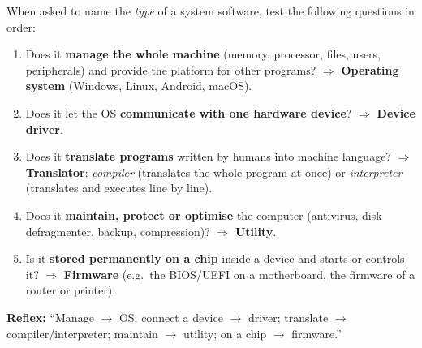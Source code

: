 \documentclass[11pt]{article}
\begin{document}
\begin{methode}
When asked to name the \emph{type} of a system software, test the following questions in order:
\begin{enumerate}
\item Does it \textbf{manage the whole machine} (memory, processor, files, users, peripherals) and provide the platform for other programs? $\Rightarrow$ \textbf{Operating system} (Windows, Linux, Android, macOS).
\item Does it let the OS \textbf{communicate with one hardware device}? $\Rightarrow$ \textbf{Device driver}.
\item Does it \textbf{translate programs} written by humans into machine language? $\Rightarrow$ \textbf{Translator}: \emph{compiler} (translates the whole program at once) or \emph{interpreter} (translates and executes line by line).
\item Does it \textbf{maintain, protect or optimise} the computer (antivirus, disk defragmenter, backup, compression)? $\Rightarrow$ \textbf{Utility}.
\item Is it \textbf{stored permanently on a chip} inside a device and starts or controls it? $\Rightarrow$ \textbf{Firmware} (e.g.\ the BIOS/UEFI on a motherboard, the firmware of a router or printer).
\end{enumerate}
\textbf{Reflex:} ``Manage $\to$ OS; connect a device $\to$ driver; translate $\to$ compiler/interpreter; maintain $\to$ utility; on a chip $\to$ firmware.''
\end{methode}
\end{document}
